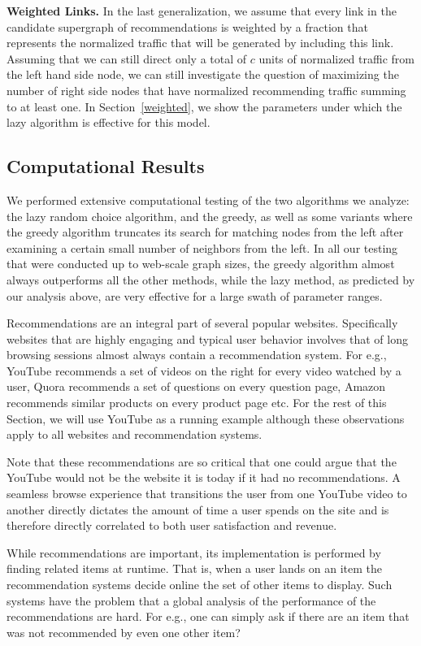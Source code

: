 {\bf Weighted Links.}
In the last generalization, we assume that every link in the candidate
supergraph of recommendations is weighted by a fraction that represents the
normalized traffic that will be generated by including this link. Assuming that
we can still direct only a total of $c$ units of normalized traffic from the
left hand side node, we can still investigate the question of maximizing the
number of right side nodes that have normalized recommending traffic summing to
at least one. In Section~\ref{weighted}, we show the parameters under which the
lazy algorithm is effective for this model. \vs

\subsection{Computational Results}
We performed extensive computational testing of the two algorithms we analyze:
the lazy random choice algorithm, and the greedy, as well as some variants where
the greedy algorithm truncates its search for matching nodes from the left after
examining a certain small number of neighbors from the left. In all our testing
that were conducted up to web-scale graph sizes, the greedy algorithm almost
always outperforms all the other methods, while the lazy method, as predicted by
our analysis above, are very effective for a large swath of parameter ranges. 


\iffalse

Recommendations are an integral part of several popular websites. Specifically
websites that are highly engaging and typical user behavior involves that
of long browsing sessions almost always contain a recommendation system. For
e.g., YouTube recommends a set of videos on the right for every video watched
by a user, Quora recommends a set of questions on every question page, Amazon
recommends similar products on every product page etc. For the rest of this
Section, we will use YouTube as a running example although these observations
apply to all websites and recommendation systems. \vs

Note that these recommendations are so critical that one could argue that the
YouTube would not be the website it is today if it had no recommendations. A
seamless browse experience that transitions the user from one YouTube video to
another directly dictates the amount of time a user spends on the site and is
therefore directly correlated to both user satisfaction and revenue. \vs

While recommendations are important, its implementation is performed by finding
related items at runtime. That is, when a user lands on an item the
recommendation systems decide online the set of other items to display. Such
systems have the problem that a global analysis of the performance of the
recommendations are hard. For e.g., one can simply ask if there are an item that
was not recommended by even one other item? \vs

